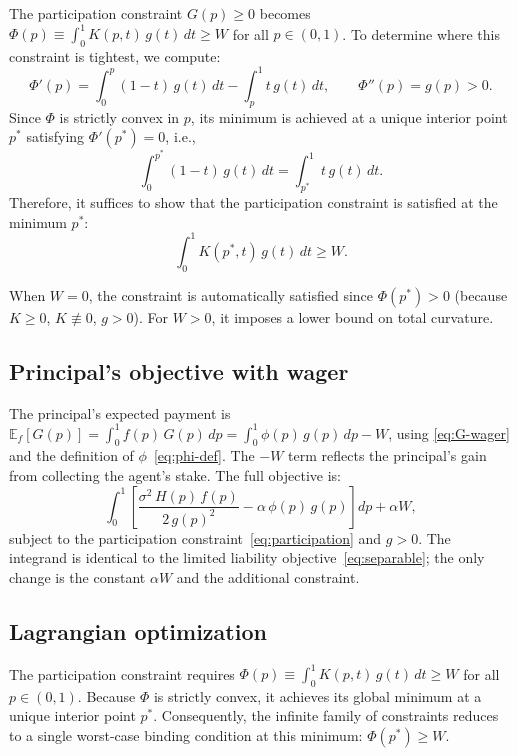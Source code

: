 \documentclass[11pt]{article}
\begin{document}
The participation constraint $G(p) \geq 0$ becomes $\Phi(p) \equiv \int_0^1 K(p,t)\,g(t)\,dt \geq W$ for all $p \in (0,1)$. To determine where this constraint is tightest, we compute:
\[
\Phi'(p) = \int_0^p (1-t)\,g(t)\,dt - \int_p^1 t\,g(t)\,dt, \qquad \Phi''(p) = g(p) > 0.
\]
Since $\Phi$ is strictly convex in $p$, its minimum is achieved at a unique interior point $p^*$ satisfying $\Phi'(p^*) = 0$, i.e.,
\begin{equation}\label{eq:Phi-min}
\int_0^{p^*} (1-t)\,g(t)\,dt = \int_{p^*}^1 t\,g(t)\,dt.
\end{equation}
Therefore, it suffices to show that the participation constraint is satisfied at the minimum $p^*$:
\begin{equation}\label{eq:participation}
\int_0^1 K(p^*,t)\,g(t)\,dt \geq W.
\end{equation}

When $W = 0$, the constraint is automatically satisfied since $\Phi(p^*) > 0$ (because $K \geq 0$, $K \not\equiv 0$, $g > 0$). For $W > 0$, it imposes a lower bound on total curvature.

\subsection{Principal's objective with wager}

The principal's expected payment is $\mathbb{E}_f[G(p)] = \int_0^1 f(p)\,G(p)\,dp = \int_0^1 \phi(p)\,g(p)\,dp - W$, using \eqref{eq:G-wager} and the definition of $\phi$~\eqref{eq:phi-def}. The $-W$ term reflects the principal's gain from collecting the agent's stake. The full objective is:
\begin{equation}\label{eq:wager-objective}
\int_0^1 \left[\frac{\sigma^2\,H(p)\,f(p)}{2\,g(p)^2} - \alpha\,\phi(p)\,g(p)\right]dp + \alpha W,
\end{equation}
subject to the participation constraint~\eqref{eq:participation} and $g > 0$. The integrand is identical to the limited liability objective~\eqref{eq:separable}; the only change is the constant $\alpha W$ and the additional constraint.

\subsection{Lagrangian optimization}\label{sec:lagrangian}

The participation constraint requires $\Phi(p) \equiv \int_0^1 K(p,t)\,g(t)\,dt \geq W$ for all $p \in (0,1)$. Because $\Phi$ is strictly convex, it achieves its global minimum at a unique interior point $p^*$. Consequently, the infinite family of constraints reduces to a single worst-case binding condition at this minimum: $\Phi(p^*) \geq W$.
\end{document}
